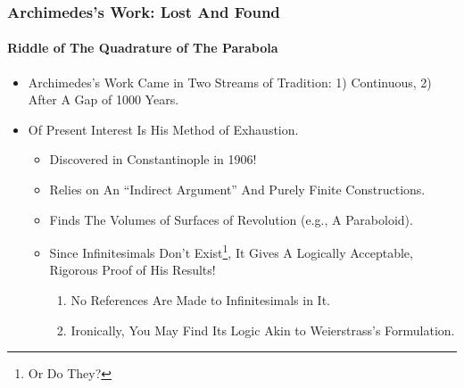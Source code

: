\begin{frame}
\frametitle{Archimedes's Work: Lost And Found}
\framesubtitle{Riddle of The Quadrature of The Parabola}
\label{slide:archimedes-method}
\begin{itemize}
\pause
\item \alert{Archimedes's Work Came in Two Streams of Tradition}: 1) Continuous, 2) After A Gap of 1000 Years.
\pause
\item Of Present Interest Is His \alert{Method of Exhaustion}.
\begin{itemize}
\pause
\item Discovered in Constantinople in 1906!
\pause
\item Relies on \alert{An ``Indirect Argument''} And \alert{Purely Finite Constructions}.
\pause
\item Finds The Volumes of \alert{Surfaces of Revolution} (e.g., A Paraboloid).
\pause
\item Since \alert{Infinitesimals Don't Exist\footnote{Or Do They?}}, It Gives A Logically Acceptable, Rigorous Proof of His Results!
\begin{enumerate}
\pause
\item No References Are Made to \alert{Infinitesimals} in It.
\pause
\item Ironically, You May Find Its Logic Akin to \alert{Weierstrass's} Formulation.
\end{enumerate}
\end{itemize}
\end{itemize}
\end{frame}
